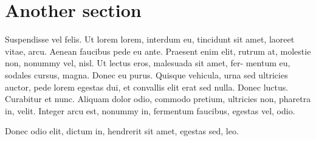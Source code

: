 \documentclass[openany]{book}
\begin{document}
\lipsum[3-5]


\section{Another section}


\bigskip

\lipsum[6-8]

\bigskip
Suspendisse vel felis. Ut lorem lorem, interdum eu, tincidunt sit amet, laoreet vitae, arcu. Aenean faucibus pede eu ante. Praesent enim elit, rutrum at, molestie non, nonummy vel, nisl. Ut lectus eros, malesuada sit amet, fer- mentum eu, sodales cursus, magna. Donec eu purus. Quisque vehicula, urna sed ultricies auctor, pede lorem egestas dui, et convallis elit erat sed nulla. Donec luctus. Curabitur et nunc. Aliquam dolor odio, commodo pretium, ultricies non, pharetra in, velit. Integer arcu est, nonummy in, fermentum faucibus, egestas vel, odio.

\bigskip

Donec odio elit, dictum in, hendrerit sit amet, egestas sed, leo.

\bigskip

\lipsum[8-9]
\end{document}
